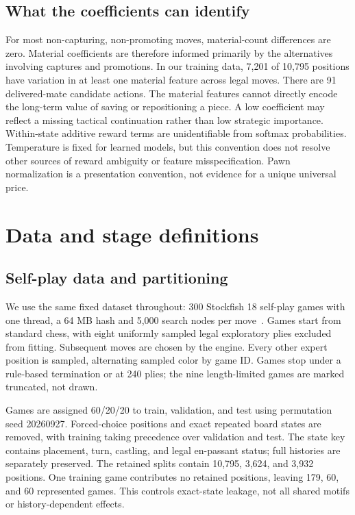 \documentclass[11pt]{article}
\begin{document}
\subsection{What the coefficients can identify}
For most non-capturing, non-promoting moves, material-count differences are zero. Material coefficients are therefore informed primarily by the alternatives involving captures and promotions. In our training data, 7,201 of 10,795 positions have variation in at least one material feature across legal moves. There are 91 delivered-mate candidate actions. The material features cannot directly encode the long-term value of saving or repositioning a piece. A low coefficient may reflect a missing tactical continuation rather than low strategic importance. Within-state additive reward terms are unidentifiable from softmax probabilities. Temperature is fixed for learned models, but this convention does not resolve other sources of reward ambiguity or feature misspecification. Pawn normalization is a presentation convention, not evidence for a unique universal price.


\section{Data and stage definitions}
\subsection{Self-play data and partitioning}
We use the same fixed dataset throughout: 300 Stockfish 18 self-play games with one thread, a 64 MB hash and 5,000 search nodes per move\ \cite{stockfish}. Games start from standard chess, with eight uniformly sampled legal exploratory plies excluded from fitting. Subsequent moves are chosen by the engine. Every other expert position is sampled, alternating sampled color by game ID. Games stop under a rule-based termination or at 240 plies; the nine length-limited games are marked truncated, not drawn.

Games are assigned 60/20/20 to train, validation, and test using permutation seed 20260927. Forced-choice positions and exact repeated board states are removed, with training taking precedence over validation and test. The state key contains placement, turn, castling, and legal en-passant status; full histories are separately preserved. The retained splits contain 10,795, 3,624, and 3,932 positions. One training game contributes no retained positions, leaving 179, 60, and 60 represented games. This controls exact-state leakage, not all shared motifs or history-dependent effects.
\end{document}
